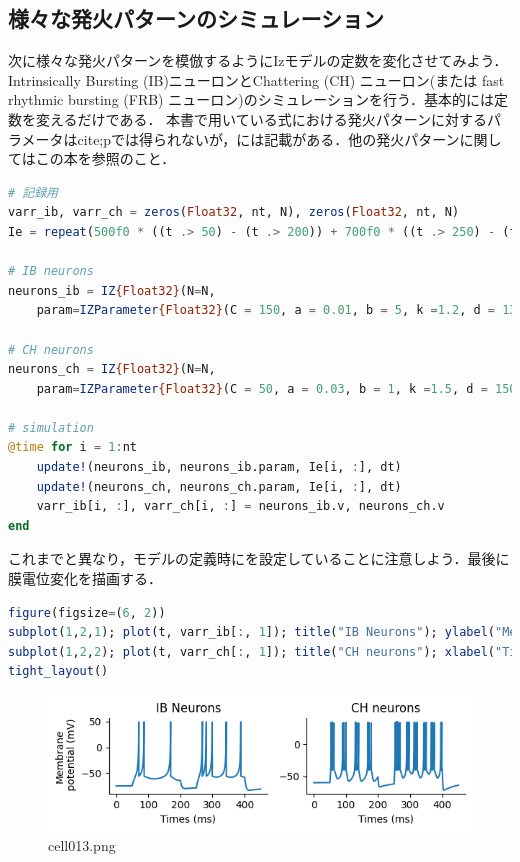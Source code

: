 \subsection{様々な発火パターンのシミュレーション}
次に様々な発火パターンを模倣するようにIzモデルの定数を変化させてみよう．Intrinsically Bursting (IB)ニューロンとChattering (CH) ニューロン(または fast rhythmic bursting (FRB) ニューロン)のシミュレーションを行う．基本的には定数を変えるだけである．
本書で用いている式における発火パターンに対するパラメータは{cite;p}では得られないが，\citep{Izhikevich2007-ff}には記載がある．他の発火パターンに関してはこの本を参照のこと．
\begin{lstlisting}[language=julia]
# 記録用
varr_ib, varr_ch = zeros(Float32, nt, N), zeros(Float32, nt, N)
Ie = repeat(500f0 * ((t .> 50) - (t .> 200)) + 700f0 * ((t .> 250) - (t .> 400)), 1, N)  # injection current

# IB neurons
neurons_ib = IZ{Float32}(N=N, 
    param=IZParameter{Float32}(C = 150, a = 0.01, b = 5, k =1.2, d = 130, vrest = -75, vreset = -56, vthr = -45, vpeak = 50))

# CH neurons
neurons_ch = IZ{Float32}(N=N, 
    param=IZParameter{Float32}(C = 50, a = 0.03, b = 1, k =1.5, d = 150, vrest = -60, vreset = -40, vthr = -40, vpeak = 35))

# simulation
@time for i = 1:nt
    update!(neurons_ib, neurons_ib.param, Ie[i, :], dt)
    update!(neurons_ch, neurons_ch.param, Ie[i, :], dt)
    varr_ib[i, :], varr_ch[i, :] = neurons_ib.v, neurons_ch.v
end
\end{lstlisting}
これまでと異なり，モデルの定義時にを設定していることに注意しよう．最後に膜電位変化を描画する．
\begin{lstlisting}[language=julia]
figure(figsize=(6, 2))
subplot(1,2,1); plot(t, varr_ib[:, 1]); title("IB Neurons"); ylabel("Membrane\n potential (mV)");  xlabel("Times (ms)")
subplot(1,2,2); plot(t, varr_ch[:, 1]); title("CH neurons"); xlabel("Times (ms)")
tight_layout()
\end{lstlisting}
\begin{figure}[ht]
	\centering
	\includegraphics[scale=0.8, max width=\linewidth]{./fig/neuron-model/izhikevich/cell013.png}
	\caption{cell013.png}
	\label{cell013.png}
\end{figure}
